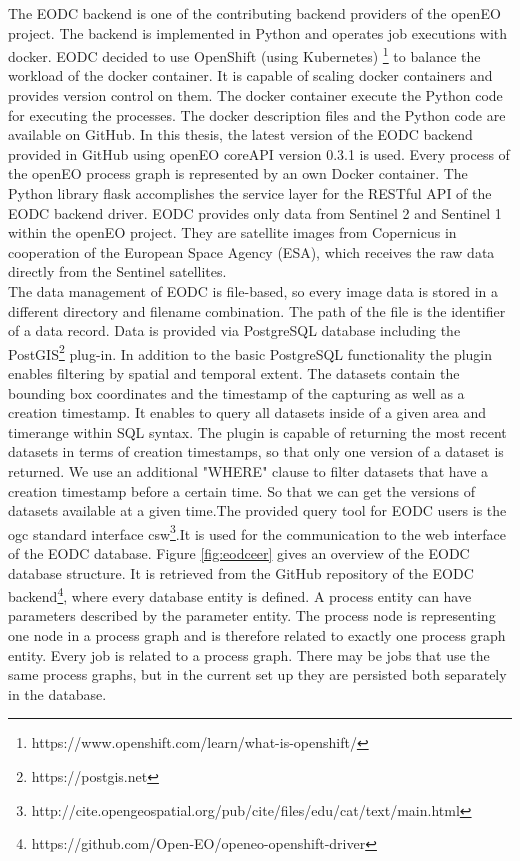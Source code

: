 \documentclass[draft,final]{vutinfth} %
\newcommand{\bgoesswein}[1]{{\color{blue}#1}}
\begin{document}
The EODC backend is one of the contributing backend providers of the openEO project. The backend is implemented in Python and operates job executions with docker. EODC decided to use OpenShift (using Kubernetes) \footnote{https://www.openshift.com/learn/what-is-openshift/} to balance the workload of the docker container. It is capable of scaling docker containers and provides version control on them. The docker container execute the Python code for executing the processes. The docker description files and the Python code are available on GitHub. In this thesis, the latest version of the EODC backend provided in GitHub using openEO coreAPI version 0.3.1 is used. Every process of the openEO process graph is represented by an own Docker container. The Python library flask accomplishes the service layer for the RESTful API of the EODC backend driver. EODC provides only data from Sentinel 2 and Sentinel 1 within the openEO project. They are satellite images from Copernicus in cooperation of the European Space Agency (ESA), which receives the raw data directly from the Sentinel satellites. \\
The data management of EODC is file-based, so every image data is stored in a different directory and filename combination. The path of the file is the identifier of a data record. Data is provided via PostgreSQL database including the PostGIS\footnote{https://postgis.net} plug-in. \bgoesswein{In addition to the basic PostgreSQL functionality the plugin enables filtering by spatial and temporal extent. The datasets contain the bounding box coordinates and the timestamp of the capturing as well as a creation timestamp. It enables to query all datasets inside of a given area and timerange within SQL syntax. The plugin is capable of returning the most recent datasets in terms of creation timestamps, so that only one version of a dataset is returned. We use an additional "WHERE" clause to filter datasets that have a creation timestamp before a certain time. So that we can get the versions of datasets available at a given time.}The provided query tool for EODC users is the \gls{ogc} standard interface \gls{csw}\footnote{http://cite.opengeospatial.org/pub/cite/files/edu/cat/text/main.html}.\bgoesswein{It is used for the communication to the web interface of the EODC database.} Figure \ref{fig:eodceer} gives an overview of the EODC database structure. It is retrieved from the GitHub repository of the EODC backend\footnote{https://github.com/Open-EO/openeo-openshift-driver}, where every database entity is defined. A process entity can have parameters described by the parameter entity. The process node is representing one node in a process graph and is therefore related to exactly one process graph entity. Every job is related to a process graph. There may be jobs that use the same process graphs, but in the current set up they are persisted both separately in the database.
\end{document}
